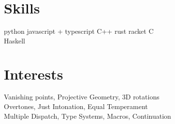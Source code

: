 \documentclass[]{deedy-resume-openfont}
\begin{document}
\begin{minipage}[t]{0.30\textwidth}
\section{Skills}
python \textbullet{} javascript + typescript \textbullet{} C++ \textbullet{} rust \textbullet{} racket \textbullet{} C \\
 Haskell \\

\sectionsep

\vspace{1em}

\section{Interests}
 Vanishing points, Projective Geometry, 3D rotations \\
 Overtones, Just Intonation, Equal Temperament \\
 Multiple Dispatch, Type Systems, Macros, Continuation

\sectionsep

%
%

\end{minipage} 
\hfill
\end{document}
